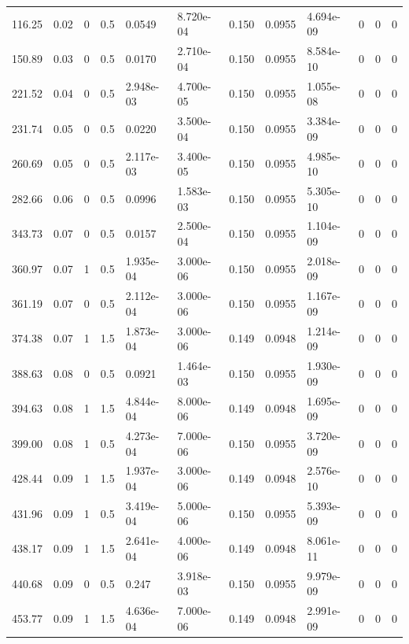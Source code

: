 \documentclass[preview]{standalone}
\begin{document}
{{\begin{tabular}{L{1.2cm}C{1.2cm} C{0.3cm}C{0.5cm} C{1.4cm}C{1.4cm} C{1.4cm}C{1.4cm} C{1.6cm}C{1.6cm} C{1.6cm}C{1.6cm}}
  116.25  &  0.02  & 0     & 0.5 &  0.0549  & 8.720e-04  &  0.150&   0.0955& 4.694e-09 & 0   &  0 & 0  \\ 
  150.89  &  0.03  & 0     & 0.5 &  0.0170  & 2.710e-04  &  0.150&   0.0955& 8.584e-10 & 0   &  0 & 0  \\ 
  221.52  &  0.04  & 0     & 0.5 &  2.948e-03  & 4.700e-05  &  0.150&   0.0955& 1.055e-08 & 0   &  0 & 0  \\ 
  231.74  &  0.05  & 0     & 0.5 &  0.0220  & 3.500e-04  &  0.150&   0.0955& 3.384e-09 & 0   &  0 & 0  \\ 
  260.69  &  0.05  & 0     & 0.5 &  2.117e-03  & 3.400e-05  &  0.150&   0.0955& 4.985e-10 & 0   &  0 & 0  \\ 
  282.66  &  0.06  & 0     & 0.5 &  0.0996  & 1.583e-03  &  0.150&   0.0955& 5.305e-10 & 0   &  0 & 0  \\ 
  343.73  &  0.07  & 0     & 0.5 &  0.0157  & 2.500e-04  &  0.150&   0.0955& 1.104e-09 & 0   &  0 & 0  \\ 
  360.97  &  0.07  & 1     & 0.5 &  1.935e-04  & 3.000e-06  &  0.150&   0.0955& 2.018e-09 & 0   &  0 & 0  \\ 
  361.19  &  0.07  & 0     & 0.5 &  2.112e-04  & 3.000e-06  &  0.150&   0.0955& 1.167e-09 & 0   &  0 & 0  \\ 
  374.38  &  0.07  & 1     & 1.5 &  1.873e-04  & 3.000e-06  &  0.149&   0.0948& 1.214e-09 & 0   &  0 & 0  \\ 
  388.63  &  0.08  & 0     & 0.5 &  0.0921  & 1.464e-03  &  0.150&   0.0955& 1.930e-09 & 0   &  0 & 0  \\ 
  394.63  &  0.08  & 1     & 1.5 &  4.844e-04  & 8.000e-06  &  0.149&   0.0948& 1.695e-09 & 0   &  0 & 0  \\ 
  399.00  &  0.08  & 1     & 0.5 &  4.273e-04  & 7.000e-06  &  0.150&   0.0955& 3.720e-09 & 0   &  0 & 0  \\ 
  428.44  &  0.09  & 1     & 1.5 &  1.937e-04  & 3.000e-06  &  0.149&   0.0948& 2.576e-10 & 0   &  0 & 0  \\ 
  431.96  &  0.09  & 1     & 0.5 &  3.419e-04  & 5.000e-06  &  0.150&   0.0955& 5.393e-09 & 0   &  0 & 0  \\ 
  438.17  &  0.09  & 1     & 1.5 &  2.641e-04  & 4.000e-06  &  0.149&   0.0948& 8.061e-11 & 0   &  0 & 0  \\ 
  440.68  &  0.09  & 0     & 0.5 &  0.247  & 3.918e-03  &  0.150&   0.0955& 9.979e-09 & 0   &  0 & 0  \\ 
  453.77  &  0.09  & 1     & 1.5 &  4.636e-04  & 7.000e-06  &  0.149&   0.0948& 2.991e-09 & 0   &  0 & 0  \\ 

\end{tabular}}}
\end{document}
